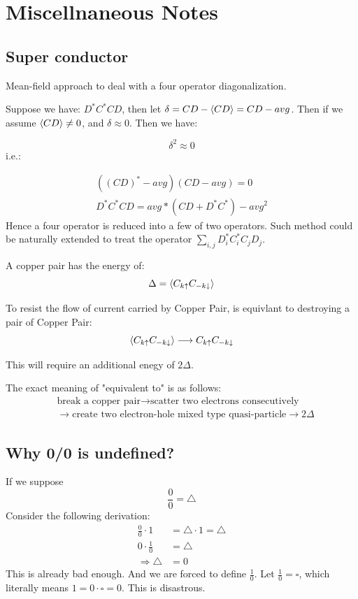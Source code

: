 \documentclass{article}
\numberwithin{equation}{subsection} %
\theoremstyle{definition}
\begin{document}
    

\section{Miscellnaneous Notes}
    \subsection{Super conductor}
    Mean-field approach to deal with a four operator diagonalization.
    
    Suppose we have: $D^*C^* CD$, then let $\delta = CD - \braket{CD} =
    CD - avg$. Then if we assume $\braket{CD}\neq 0$, and $\delta \approx 0$. Then we have:
    
    	$$ \delta^2 \approx 0 $$
    i.e.:
    
    \begin{align}
    	( (CD)^* - avg ) ( CD - avg ) = 0\\
    	D^*C^*CD = avg*(CD+D^*C^*) - avg^2
    \end{align}
    Hence a four operator is reduced into a few of two operators.
    Such method could be naturally extended to treat the operator
    $\sum_{i,j} D^*_i C^*_i C_j D_j$.
    
    A copper pair has the energy of:
    $$\Delta = \braket{C_{k \uparrow}C_{-k \downarrow} }$$
    
    To resist the flow of current carried by Copper Pair, is equivlant to destroying a pair of Copper Pair:
    $$ \braket{C_{k \uparrow}C_{-k \downarrow} } \longrightarrow C_{k \uparrow}C_{-k \downarrow}$$
    
    This will require an additional enegy of $2\Delta$.
    
    The exact meaning of "equivalent to" is as follows:
    \begin{align}
        & \text{break a copper pair} \longrightarrow 
        \text{scatter two electrons consecutively} 
        \nonumber\\ & \longrightarrow 
        \text{create two electron-hole mixed type quasi-particle} \longrightarrow 2\Delta \nonumber
    \end{align}

    \subsection{Why 0/0 is undefined?}
    If we suppose
    $$ \frac{0}{0}= \triangle $$
    Consider the following derivation:
    \begin{align}
	    \frac{0}{0} \cdot 1 &= \triangle \cdot 1 = \triangle \\
	    0 \cdot \frac{1}{0} &= \triangle\\
	    \Rightarrow \triangle &= 0
    \end{align}
    This is already bad enough. And we are forced to define $\frac{1}{0}$.
    Let $\frac{1}{0} = \square$, which literally means $1=0\cdot \square = 0$.
    This is disastrous.
\end{document}
